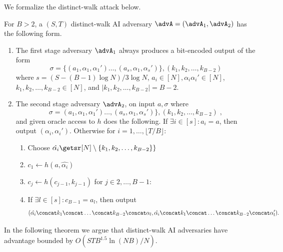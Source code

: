 We formalize the distinct-walk attack below.
\begin{definition} For $B>2$, a $(S,T)$ distinct-walk AI adversary $\advA=(\advA_1,\advA_2)$ has the following form.
\begin{enumerate}
    \item The first stage adversary $\advA_1$ always produces a bit-encoded output of the form \[\sigma=\{(a_1,\alpha_1,\alpha_1')\ldots,(a_s,\alpha_1,\alpha_s')\},(k_1,k_2,\ldots,k_{B-2})\] where $s=(S-(B-1)\log N)/3\log N$, $a_i\in [N],\alpha_i\alpha_i'\in [N]$, $k_1,k_2,\ldots,k_{B-2}\in [N]$, and $|k_1,k_2,\ldots,k_{B-2}|=B-2$.
    \item The second stage adversary $\advA_2$, on input $a,\sigma$ where $$\sigma= (a_1,\alpha_1,\alpha_1')\ldots,(a_s,\alpha_1,\alpha_s')\}, (k_1,k_2,\ldots,k_{B-2})\;,$$ and given oracle access to $h$ does the following.
    If $\exists i\in [s]:a_i=a$, then output $(\alpha_i,\alpha_i')$. Otherwise for $i=1,\ldots,\lfloor T/B\rfloor$:
    \begin{enumerate}
        \item Choose $\hat{\alpha_i}\getsr [N]\setminus \{k_1,k_2,\ldots,k_{B-2}\}\}$
        \item $c_1\gets h(a,\hat{\alpha_i})$
        \item  $c_j\gets h(c_{j-1},k_{j-1})$ for $j\in 2,\ldots, B-1$:
        \item If $\exists l\in [s]: c_{B-1}= a_l$, then output $$(\hat{\alpha_i}\concat k_{1}\concat \ldots\concat k_{B-2}\concat \alpha_{l},\hat{\alpha_i}\concat k_{1}\concat \ldots\concat k_{B-2}\concat \alpha_{l}').$$
    \end{enumerate}
\end{enumerate}
\end{definition}

In the following theorem we argue that distinct-walk AI adversaries have advantage bounded by $O({STB^{1.5} \ln(NB)}/{N})$. 

